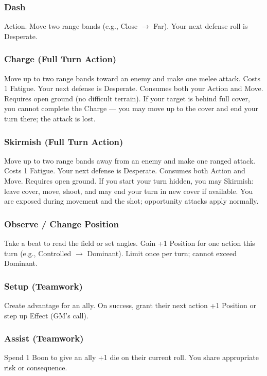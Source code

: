 \subsubsection{Dash}
Action. Move two range bands (e.g., Close $\rightarrow$ Far). Your next defense roll is Desperate.

\subsubsection{Charge (Full Turn Action)}
Move up to two range bands toward an enemy and make one melee attack. Costs 1 Fatigue. Your next defense is Desperate. Consumes both your Action and Move. Requires open ground (no difficult terrain). If your target is behind full cover, you cannot complete the Charge --- you may move up to the cover and end your turn there; the attack is lost.

\subsubsection{Skirmish (Full Turn Action)}
Move up to two range bands away from an enemy and make one ranged attack. Costs 1 Fatigue. Your next defense is Desperate. Consumes both Action and Move. Requires open ground. If you start your turn hidden, you may Skirmish: leave cover, move, shoot, and may end your turn in new cover if available. You are exposed during movement and the shot; opportunity attacks apply normally.

\subsubsection{Observe / Change Position}
Take a beat to read the field or set angles. Gain +1 Position for one action this turn (e.g., Controlled $\rightarrow$ Dominant). Limit once per turn; cannot exceed Dominant.

\subsubsection{Setup (Teamwork)}
Create advantage for an ally. On success, grant their next action +1 Position or step up Effect (GM's call).

\subsubsection{Assist (Teamwork)}
Spend 1 Boon to give an ally +1 die on their current roll. You share appropriate risk or consequence.

